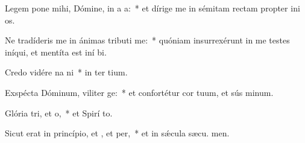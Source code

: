 \item Legem pone mihi, Dómine, in a a:~* et dírige me in sémitam rectam propter ini os.
\item Ne tradíderis me in ánimas tributi me:~* quóniam insurrexérunt in me testes iníqui, et mentíta est iní bi.
\item Credo vidére na ni~* in ter tium.
\item Exspécta Dóminum, viliter ge:~* et confortétur cor tuum, et sús minum.
\item Glória tri, et o,~* et Spirí to.
\item Sicut erat in princípio, et , et per,~* et in sǽcula sæcu. men.

